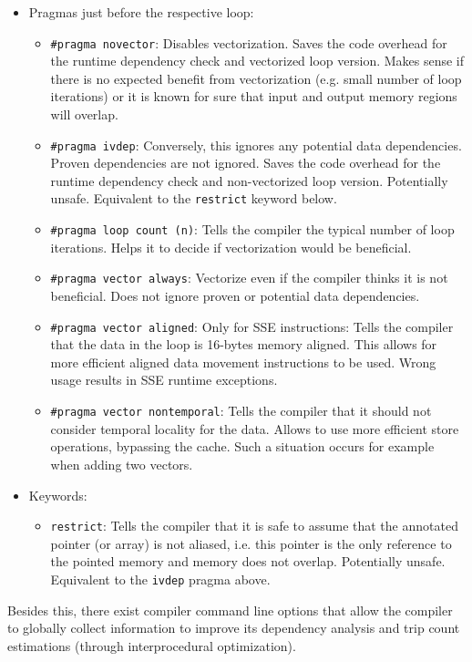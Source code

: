 \documentclass[11pt]{article}
\begin{document}
\begin{itemize}
\item Pragmas just before the respective loop:
\begin{itemize}
\item \texttt{\#pragma novector}: Disables vectorization. Saves the code overhead for the runtime dependency check and vectorized loop version. Makes sense if there is no expected benefit from vectorization (e.g. small number of loop iterations) or it is known for sure that input and output memory regions will overlap.
\item \texttt{\#pragma ivdep}: Conversely, this ignores any potential data dependencies. Proven dependencies are not ignored. Saves the code overhead for the runtime dependency check and non-vectorized loop version. Potentially unsafe. Equivalent to the \texttt{restrict} keyword below.
\item \texttt{\#pragma loop count (n)}: Tells the compiler the typical number of loop iterations. Helps it to decide if vectorization would be beneficial.
\item \texttt{\#pragma vector always}: Vectorize even if the compiler thinks it is not beneficial. Does not ignore proven or potential data dependencies.
\item \texttt{\#pragma vector aligned}: Only for SSE instructions: Tells the compiler that the data in the loop is 16-bytes memory aligned. This allows for more efficient aligned data movement instructions to be used. Wrong usage results in SSE runtime exceptions.
\item \texttt{\#pragma vector nontemporal}: Tells the compiler that it should not consider temporal locality for the data. Allows to use more efficient store operations, bypassing the cache. Such a situation occurs for example when adding two vectors.
\end{itemize}
\item Keywords:
\begin{itemize}
\item \texttt{restrict}: Tells the compiler that it is safe to assume that the annotated pointer (or array) is not aliased, i.e. this pointer is the only reference to the pointed memory and memory does not overlap. Potentially unsafe. Equivalent to the \texttt{ivdep} pragma above.
\end{itemize}
\end{itemize}

Besides this, there exist compiler command line options that allow the compiler to globally collect information to improve its dependency analysis and trip count estimations (through interprocedural optimization).
\end{document}
